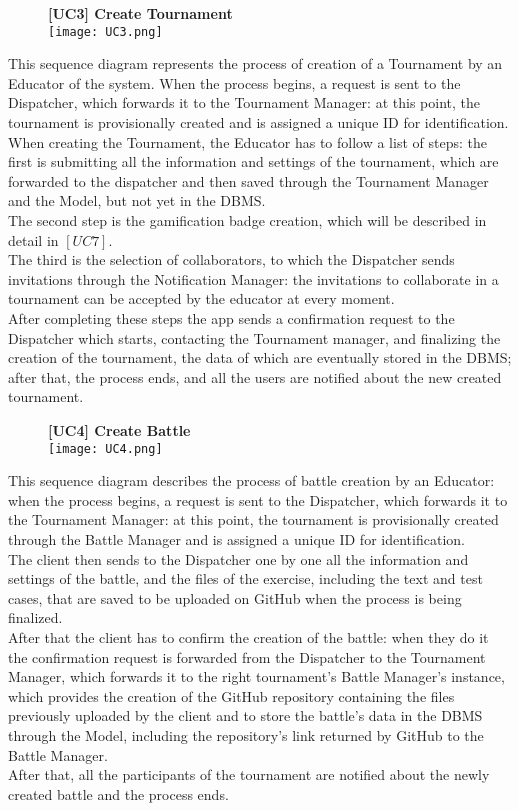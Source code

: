 \documentclass{article}
\begin{document}
\begin{figure}[H]
    \centering
    \textbf{[UC3] Create Tournament} \\
    \texttt{[image: UC3.png]}
\end{figure}
\noindent
This sequence diagram represents the process of creation of a Tournament by an Educator of the system.
When the process begins, a request is sent to the Dispatcher, which forwards it to the Tournament Manager: at this point, the tournament is provisionally created and is assigned a unique ID for identification.\\
When creating the Tournament, the Educator has to follow a list of steps: the first is submitting all the information and settings of the tournament, which are forwarded to the dispatcher and then saved through the Tournament Manager and the Model, but not yet in the DBMS.\\
The second step is the gamification badge creation, which will be described in detail in $[UC7]$.\\
The third is the selection of collaborators, to which the Dispatcher sends invitations through the Notification Manager: the invitations to collaborate in a tournament can be accepted by the educator at every moment.\\
After completing these steps the app sends a confirmation request to the Dispatcher which starts, contacting the Tournament manager, and finalizing the creation of the tournament, the data of which are eventually stored in the DBMS; after that, the process ends, and all the users are notified about the new created tournament.

\begin{figure}[H]
    \centering
    \textbf{[UC4] Create Battle } \\ 
    \texttt{[image: UC4.png]}
\end{figure}
\noindent
This sequence diagram describes the process of battle creation by an Educator: when the process begins, a request is sent to the Dispatcher, which forwards it to the Tournament Manager: at this point, the tournament is provisionally created through the Battle Manager and is assigned a unique ID for identification.\\
The client then sends to the Dispatcher one by one all the information and settings of the battle, and the files of the exercise, including the text and test cases, that are saved to be uploaded on GitHub when the process is being finalized.\\
After that the client has to confirm the creation of the battle: when they do it the confirmation request is forwarded from the Dispatcher to the Tournament Manager, which forwards it to the right tournament's Battle Manager's instance, which provides the creation of the GitHub repository containing the files previously uploaded by the client and to store the battle's data in the DBMS through the Model, including the repository's link returned by GitHub to the Battle Manager.\\
After that, all the participants of the tournament are notified about the newly created battle and the process ends.\\
\end{document}
